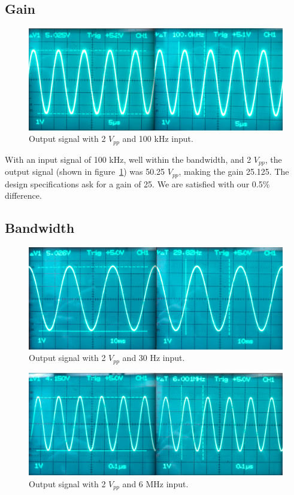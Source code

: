 \documentclass[12pt,letterpaper]{report}
\newlength \figwidth
\begin{document}
\subsection*{Gain}

\begin{figure}[H]
\centering
\includegraphics[width=\figwidth, keepaspectratio=true]{lab10_images/100kHz.png}
\caption{Output signal with 2 $V_{pp}$ and 100 kHz input.}
\label{fig:med_freq}
\end{figure}

With an input signal of 100 kHz, well within the bandwidth, and 2 $V_{pp}$, the output signal (shown in figure~\ref{fig:med_freq}) was 50.25 $V_{pp}$, making the gain 25.125. The design specifications ask for a gain of 25. We are satisfied with our 0.5\% difference.

\subsection*{Bandwidth}

\begin{figure}[H]
\centering
\includegraphics[width=\figwidth, keepaspectratio=true]{lab10_images/low_freq.png}
\caption{Output signal with 2 $V_{pp}$ and 30 Hz input.}
\label{fig:low_freq}
\end{figure}

\begin{figure}[H]
\centering
\includegraphics[width=\figwidth, keepaspectratio=true]{lab10_images/high_freq.png}
\caption{Output signal with 2 $V_{pp}$ and 6 MHz input.}
\label{fig:high_freq}
\end{figure}
\end{document}

